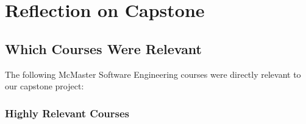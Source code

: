 \documentclass{article}
\begin{document}
\section{Reflection on Capstone}

\subsection{Which Courses Were Relevant}

\par{The following McMaster Software Engineering courses were directly relevant to our capstone project:}

\subsubsection*{Highly Relevant Courses}
\end{document}
